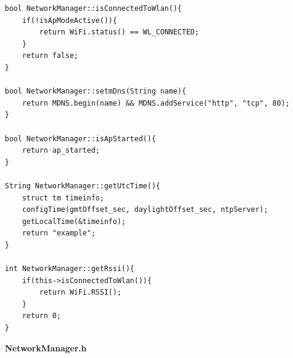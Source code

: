 \documentclass[11pt, twoside]{article}
\begin{document}
\begin{lstlisting}
bool NetworkManager::isConnectedToWlan(){
    if(!isApModeActive()){
        return WiFi.status() == WL_CONNECTED;
    }
    return false;
}

bool NetworkManager::setmDns(String name){
    return MDNS.begin(name) && MDNS.addService("http", "tcp", 80);
}

bool NetworkManager::isApStarted(){
    return ap_started;
}

String NetworkManager::getUtcTime(){
    struct tm timeinfo;
    configTime(gmtOffset_sec, daylightOffset_sec, ntpServer);
    getLocalTime(&timeinfo);
    return "example";
}

int NetworkManager::getRssi(){
    if(this->isConnectedToWlan()){
        return WiFi.RSSI();
    }
    return 0;
}\end{lstlisting}

\textbf{NetworkManager.h}
\end{document}
